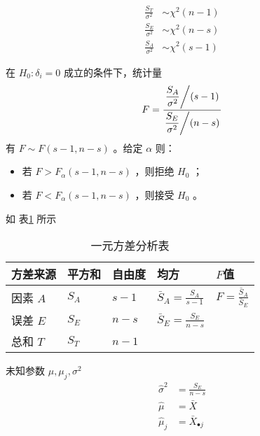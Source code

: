  \begin{align}
    \frac{S_T}{\sigma^2} & \sim \chi^2(n-1) \\
    \frac{S_E}{\sigma^2} & \sim \chi^2(n-s) \\
    \frac{S_A}{\sigma^2} & \sim \chi^2(s-1) 
\end{align}

 在 $ H_0: \delta_i = 0 $ 成立的条件下，统计量
\begin{equation}
    F = \displaystyle{\frac{\displaystyle{\left. {\frac{S_A}{\sigma^2}} \middle/ {(s-1)} \right.}}{\displaystyle{\left. {\frac{S_E}{\sigma^2}} \middle/ {(n-s)} \right.}}}
\end{equation}
有 $ F \sim F(s-1, n-s) $ 。给定 $ \alpha $ 则：

\begin{itemize}[leftmargin=\paritemindent]
    \item 若 $ F > F_\alpha(s-1, n-s) $ ，则拒绝 $ H_0 $ ；
    \item 若 $ F < F_\alpha(s-1, n-s) $ ，则接受 $ H_0 $ 。
\end{itemize}

 如 表\ref{tab:一元方差分析表} 所示

\begin{table}[hbtp]
    \renewcommand{\arraystretch}{2}
    \centering
    \caption{一元方差分析表}
    \label{tab:一元方差分析表}
    \begin{tabular}{l|l|l|l|l} \hline
        方差来源 & 平方和 & 自由度 & 均方 & $ F $值 \\\hline
        因素 $ A $ & $ S_A $ & $ s-1 $ & $ \displaystyle \bar{S}_A = \frac{S_A}{s-1} $ & $ \displaystyle F = \frac{\bar{S}_A}{\bar{S}_E} $ \\
        误差 $ E $ & $ S_E $ & $ n-s $ & $ \displaystyle \bar{S}_E = \frac{S_E}{n-s} $ & \\
        总和 $ T $ & $ S_T $ & $ n-1 $ & & \\\hline
    \end{tabular}
\end{table}

 未知参数 $ \mu, \mu_j, \sigma^2 $ 
\begin{align}
    \hat{\sigma}^2 & = \frac{S_E}{n-s} \\
    \hat{\mu} & = \bar{X} \\ 
    \hat{\mu}_j & = \bar{X}_{•j}
\end{align}